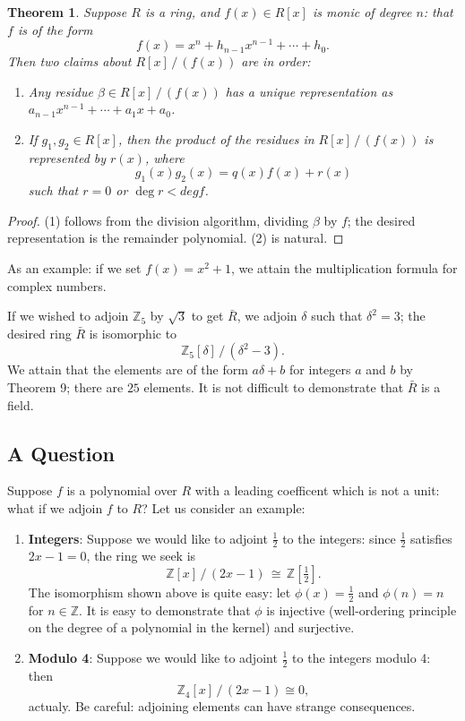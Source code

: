 \documentclass[11pt]{article}
\newtheorem{theorem}{Theorem}
\begin{document}
\begin{adjustwidth}{0.5cm}{}
  \begin{theorem}
    Suppose $R$ is a ring, and $f(x) \in R[x]$ is monic of degree $n$: that $f$ is of the form
    \[
      f(x) = x^{n} + h_{n - 1}x^{n - 1} + \cdots + h_{0}.
    \]
    Then two claims about $R[x] \,/\, (f(x))$ are in order:
    \begin{enumerate}
      \item Any residue $\beta \in R[x] \,/\, (f(x))$ has a unique representation as $a_{n - 1}x^{n - 1} + \cdots + a_{1}x + a_{0}$.
      \item If $g_{1}, g_{2} \in R[x]$, then the product of the residues in $R[x] \,/\, (f(x))$ is represented by $r(x)$, where
      \[
        g_{1}(x)g_{2}(x) = q(x)f(x) + r(x)
      \]
      such that $r = 0$ or $\deg r < deg f$.
    \end{enumerate}
  \end{theorem}
  \begin{proof}
    (1) follows from the division algorithm, dividing $\beta$ by $f$; the desired representation is the remainder polynomial. (2) is natural.
  \end{proof}
\end{adjustwidth}

As an example: if we set $f(x) = x^{2} + 1$, we attain the multiplication formula for complex numbers. 

If we wished to adjoin $\mathbb{Z}_{5}$ by $\sqrt{3}$ to get $\bar{R}$, we adjoin $\delta$ such that $\delta^{2} = 3$; the desired ring $\bar{R}$ is isomorphic to
\[
  \mathbb{Z}_{5}[\delta] \,/\, (\delta^{2} - 3).
\]
We attain that the elements are of the form $a \delta + b$ for integers $a$ and $b$ by Theorem 9; there are $25$ elements. It is not difficult to demonstrate that $\bar{R}$ is a field.


\subsection{A Question}

Suppose $f$ is a polynomial over $R$ with a leading coefficent which is not a unit: what if we adjoin $f$ to $R$? Let us consider an example:
\begin{enumerate}
  \item \textbf{Integers}: Suppose we would like to adjoint $\tfrac{1}{2}$ to the integers: since $\tfrac{1}{2}$ satisfies $2x - 1 = 0$, the ring we seek is
  \[
    \mathbb{Z}[x] \,/\, (2x - 1) \, \cong \, \mathbb{Z} \left[ \tfrac{1}{2} \right].
  \]
  The isomorphism shown above is quite easy: let $\phi(x) = \tfrac{1}{2}$ and $\phi(n) = n$ for $n \in \mathbb{Z}$. It is easy to demonstrate that $\phi$ is injective (well-ordering principle on the degree of a polynomial in the kernel) and surjective.
  \item \textbf{Modulo 4}: Suppose we would like to adjoint $\tfrac{1}{2}$ to the integers modulo 4: then
  \[
    \mathbb{Z}_{4}[x] \,/\, (2x - 1) \cong 0,
  \]
  actualy. Be careful: adjoining elements can have strange consequences.
\end{enumerate}
\end{document}
